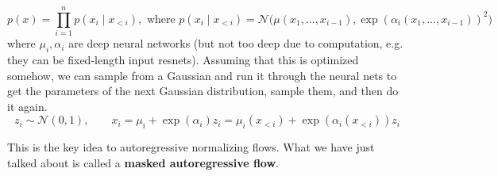 \documentclass{article}
\begin{document}
  \begin{equation}
    p(x) = \prod_{i=1}^n p(x_i \mid x_{<i}), \text{ where } p(x_i \mid x_{<i}) = \mathcal{N} \big( \mu(x_1, \ldots, x_{i-1}), \exp(\alpha_i (x_1, \ldots, x_{i-1}))^2 \big) 
  \end{equation}
  where $\mu_i, \alpha_i$ are deep neural networks (but not too deep due to computation, e.g. they can be fixed-length input resnets). Assuming that this is optimized somehow, we can sample from a Gaussian and run it through the neural nets to get the parameters of the next Gaussian distribution, sample them, and then do it again. 
  \begin{equation}
    z_i \sim \mathcal{N}(0, 1), \qquad x_i = \mu_i + \exp(\alpha_i) z_i = \mu_i (x_{<i}) + \exp(\alpha_i (x_{<i})) z_i 
  \end{equation}

  This is the key idea to autoregressive normalizing flows. What we have just talked about is called a \textbf{masked autoregressive flow}. 
\end{document}
